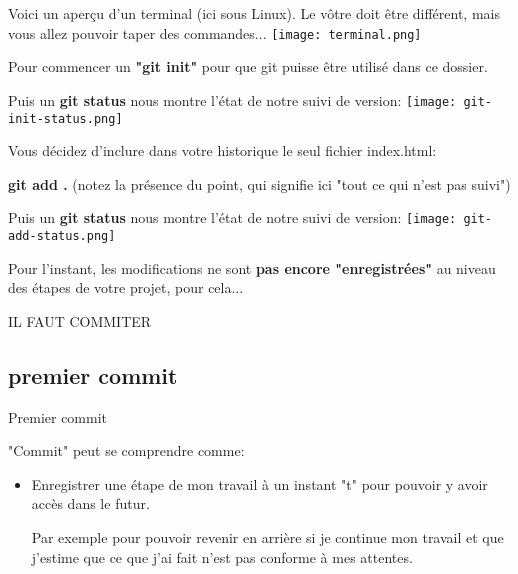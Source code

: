 \documentclass[10pt]{beamer}
\begin{document}
\begin{frame}
Voici un aperçu d'un terminal (ici sous Linux).
Le vôtre doit être différent, mais vous allez pouvoir taper des commandes...
\texttt{[image: terminal.png]}

Pour commencer un\textbf{ "git init"} pour que git puisse être utilisé dans ce dossier.

Puis un \textbf{git status} nous montre l'état de notre suivi de version:
\texttt{[image: git-init-status.png]}

\end{frame}


\begin{frame}
Vous décidez d'inclure dans votre historique le seul fichier index.html:

\textbf{git add . } (notez la présence du point, qui signifie ici "tout ce qui n'est pas suivi")

Puis un \textbf{git status} nous montre l'état de notre suivi de version:
\texttt{[image: git-add-status.png]}

Pour l'instant, les modifications ne sont \textbf{pas encore "enregistrées"} au niveau des étapes de votre projet, pour cela...

\begin{center}
\begin{Large}
IL FAUT COMMITER
\end{Large}
\end{center}

\end{frame}

\subsection{premier commit}

\begin{frame}{Premier commit}

"Commit" peut se comprendre comme:

\begin{itemize}
\item Enregistrer une étape de mon travail à un instant "t" pour pouvoir y avoir accès dans le futur.

Par exemple pour pouvoir revenir en arrière si je continue mon travail et que j'estime que ce que j'ai fait n'est pas conforme à mes attentes.
\end{itemize}

\end{frame}
\end{document}
